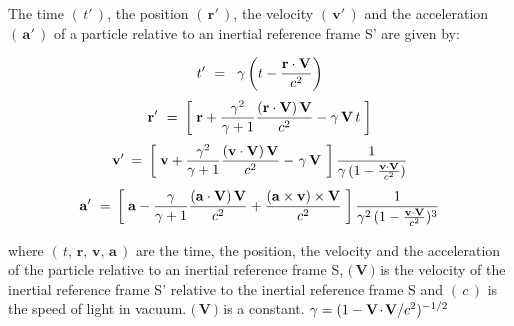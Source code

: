 \documentclass[10pt,fleqn]{article}
\begin{document}
\bigskip \smallskip

\noindent The time $( \, {t}' \, )$, the position $( \, {\mathbf{r}}' \, )$, the velocity $( \, {\mathbf{v}}' \, )$ and the acceleration $( \, {\mathbf{a}}' \, )$ of a particle relative to an inertial reference frame S' are given by:
\par \vspace{+0.21em}
\begin{eqnarray*}
{t}' ~=~ \hspace{+0.24em} \gamma \left ( t - \frac{\mathbf{r} \cdot \mathbf{V}}{c^2} \right )
\end{eqnarray*}
\vspace{-0.45em}
\begin{eqnarray*}
{\mathbf{r}}' ~=~ \hspace{-0.09em} \left [ \; \mathbf{r} + \frac{\gamma^2}{\gamma + 1} \frac{( \mathbf{r} \cdot \mathbf{V} ) \, \mathbf{V}}{c^2} - \gamma \, \mathbf{V} \, t \; \right ]
\end{eqnarray*}
\vspace{-0.30em}
\begin{eqnarray*}
{\mathbf{v}}' \hspace{-0.12em} ~=~ \hspace{-0.12em} \left [ \; \mathbf{v} + \frac{\gamma^2}{\gamma + 1} \frac{( \mathbf{v} \cdot \mathbf{V} ) \, \mathbf{V}}{c^2} - \hspace{+0.114em} \gamma \, \mathbf{V} \hspace{+0.114em} \; \right ] \frac{1}{\gamma \, ( 1 - \frac{\mathbf{v} \cdot \mathbf{V}}{c^2} )}
\end{eqnarray*}
\vspace{-0.30em}
\begin{eqnarray*}
{\mathbf{a}}' ~=~ \hspace{-0.18em} \left [ \; \mathbf{a} - \frac{\gamma}{\gamma + 1} \frac{( \mathbf{a} \cdot \mathbf{V} ) \, \mathbf{V}}{c^2} + \frac{( \mathbf{a} \times \mathbf{v} ) \times \mathbf{V}}{c^2} \; \right ] \frac{1}{\gamma^2 \, ( 1 - \frac{\mathbf{v} \cdot \mathbf{V}}{c^2} )^3}
\end{eqnarray*}
\par \vspace{+1.20em}
\noindent where $( \, t, \, \mathbf{r}, \, \mathbf{v}, \, \mathbf{a} \, )$ are the time, the position, the velocity and the acceleration of the particle relative to an inertial reference frame S, $( \, ${\small $\mathbf{V}$}$ \, )$ is the velocity of the inertial reference frame S' relative to the inertial reference frame S and $( \, c \, )$ is the speed of light in vacuum. $( \, ${\small $\mathbf{V}$}$ \, )$ is a constant. {\small $\gamma = ({1 - \mathbf{V} \hspace{-0.114em}\cdot\hspace{-0.114em} \mathbf{V}/c^2})^{-1/2}$}
\end{document}

